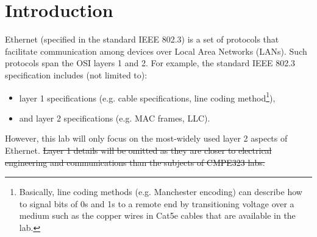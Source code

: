 \documentclass[pdftex,12pt,a4paper]{article}
\providecommand{\DIFdel}[1]{{\protect\color{red}\sout{#1}}}                      %
\providecommand{\DIFdelbegin}{} %
\providecommand{\DIFdelend}{} %
\begin{document}
    \section{Introduction}
        Ethernet (specified in the standard IEEE 802.3) is a set of protocols
        that facilitate communication among devices over Local Area Networks
        (LANs).  Such protocols span the OSI layers 1 and 2. For example, the
        standard IEEE 802.3 specification includes (not limited to):
        \begin{itemize}
            \item layer 1 specifications (e.g. cable specifications, line
            coding method\footnote{Basically, line coding methods (e.g.
            Manchester encoding) can describe how to signal bits of 0s and 1s
            to a remote end by transitioning voltage over a medium such as the
            copper wires in Cat5e cables that are available in the lab.}),
            \item and layer 2 specifications (e.g. MAC frames, LLC).
        \end{itemize}

        However, this lab will only focus on the most-widely used layer 2
        aspects of Ethernet.
\DIFdelbegin \DIFdel{Layer 1 details will be omitted as they are closer
        to electrical engineering and communications than the subjects of
        CMPE323 labs.
}\DIFdelend 
\end{document}

